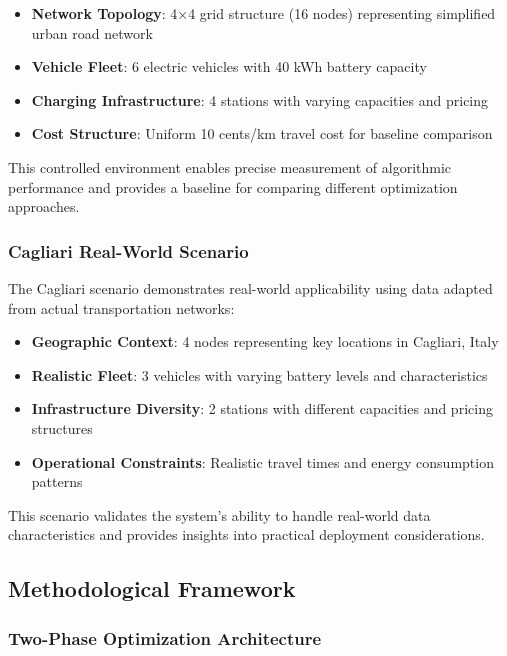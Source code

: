 \documentclass[12pt,a4paper]{article}
\begin{document}
\begin{itemize}
\item \textbf{Network Topology}: 4×4 grid structure (16 nodes) representing simplified urban road network
\item \textbf{Vehicle Fleet}: 6 electric vehicles with 40 kWh battery capacity
\item \textbf{Charging Infrastructure}: 4 stations with varying capacities and pricing
\item \textbf{Cost Structure}: Uniform 10 cents/km travel cost for baseline comparison
\end{itemize}

This controlled environment enables precise measurement of algorithmic performance and provides a baseline for comparing different optimization approaches.

\subsubsection{Cagliari Real-World Scenario}

The Cagliari scenario demonstrates real-world applicability using data adapted from actual transportation networks:

\begin{itemize}
\item \textbf{Geographic Context}: 4 nodes representing key locations in Cagliari, Italy
\item \textbf{Realistic Fleet}: 3 vehicles with varying battery levels and characteristics
\item \textbf{Infrastructure Diversity}: 2 stations with different capacities and pricing structures
\item \textbf{Operational Constraints}: Realistic travel times and energy consumption patterns
\end{itemize}

This scenario validates the system's ability to handle real-world data characteristics and provides insights into practical deployment considerations.

\subsection{Methodological Framework}

\subsubsection{Two-Phase Optimization Architecture}
\end{document}
